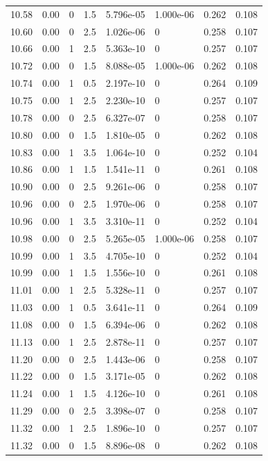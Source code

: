 \documentclass[preview]{standalone}
\begin{document}
{{{{{{{{\begin{tabular}{L{1.2cm}C{1.2cm} C{0.3cm}C{0.5cm} C{1.4cm}C{1.4cm} C{1.4cm}C{1.4cm}}
  10.58  &  0.00  & 0     & 1.5 &  5.796e-05  & 1.000e-06  & 0.262 &  0.108   \\ 
  10.60  &  0.00  & 0     & 2.5 &  1.026e-06  & 0  & 0.258 &  0.107   \\ 
  10.66  &  0.00  & 1     & 2.5 &  5.363e-10  & 0  & 0.257 &  0.107   \\ 
  10.72  &  0.00  & 0     & 1.5 &  8.088e-05  & 1.000e-06  & 0.262 &  0.108   \\ 
  10.74  &  0.00  & 1     & 0.5 &  2.197e-10  & 0  & 0.264 &  0.109   \\ 
  10.75  &  0.00  & 1     & 2.5 &  2.230e-10  & 0  & 0.257 &  0.107   \\ 
  10.78  &  0.00  & 0     & 2.5 &  6.327e-07  & 0  & 0.258 &  0.107   \\ 
  10.80  &  0.00  & 0     & 1.5 &  1.810e-05  & 0  & 0.262 &  0.108   \\ 
  10.83  &  0.00  & 1     & 3.5 &  1.064e-10  & 0  & 0.252 &  0.104   \\ 
  10.86  &  0.00  & 1     & 1.5 &  1.541e-11  & 0  & 0.261 &  0.108   \\ 
  10.90  &  0.00  & 0     & 2.5 &  9.261e-06  & 0  & 0.258 &  0.107   \\ 
  10.96  &  0.00  & 0     & 2.5 &  1.970e-06  & 0  & 0.258 &  0.107   \\ 
  10.96  &  0.00  & 1     & 3.5 &  3.310e-11  & 0  & 0.252 &  0.104   \\ 
  10.98  &  0.00  & 0     & 2.5 &  5.265e-05  & 1.000e-06  & 0.258 &  0.107   \\ 
  10.99  &  0.00  & 1     & 3.5 &  4.705e-10  & 0  & 0.252 &  0.104   \\ 
  10.99  &  0.00  & 1     & 1.5 &  1.556e-10  & 0  & 0.261 &  0.108   \\ 
  11.01  &  0.00  & 1     & 2.5 &  5.328e-11  & 0  & 0.257 &  0.107   \\ 
  11.03  &  0.00  & 1     & 0.5 &  3.641e-11  & 0  & 0.264 &  0.109   \\ 
  11.08  &  0.00  & 0     & 1.5 &  6.394e-06  & 0  & 0.262 &  0.108   \\ 
  11.13  &  0.00  & 1     & 2.5 &  2.878e-11  & 0  & 0.257 &  0.107   \\ 
  11.20  &  0.00  & 0     & 2.5 &  1.443e-06  & 0  & 0.258 &  0.107   \\ 
  11.22  &  0.00  & 0     & 1.5 &  3.171e-05  & 0  & 0.262 &  0.108   \\ 
  11.24  &  0.00  & 1     & 1.5 &  4.126e-10  & 0  & 0.261 &  0.108   \\ 
  11.29  &  0.00  & 0     & 2.5 &  3.398e-07  & 0  & 0.258 &  0.107   \\ 
  11.32  &  0.00  & 1     & 2.5 &  1.896e-10  & 0  & 0.257 &  0.107   \\ 
  11.32  &  0.00  & 0     & 1.5 &  8.896e-08  & 0  & 0.262 &  0.108   \\ 
\hline 
\end{tabular} 

}}}}}}}}
\end{document}
